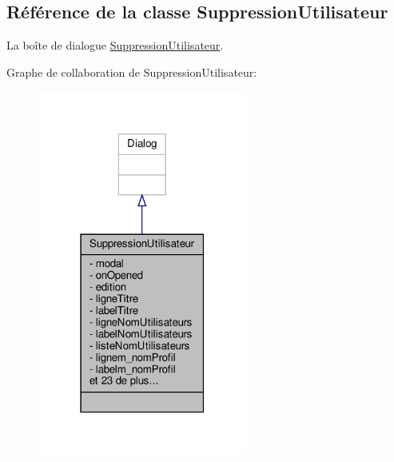 \hypertarget{class_suppression_utilisateur}{}\subsection{Référence de la classe Suppression\+Utilisateur}
\label{class_suppression_utilisateur}


La boîte de dialogue \hyperlink{class_suppression_utilisateur}{Suppression\+Utilisateur}.  




Graphe de collaboration de Suppression\+Utilisateur\+:\nopagebreak
\begin{figure}[H]
\begin{center}
\leavevmode
\includegraphics[width=195pt]{class_suppression_utilisateur__coll__graph}
\end{center}
\end{figure}

